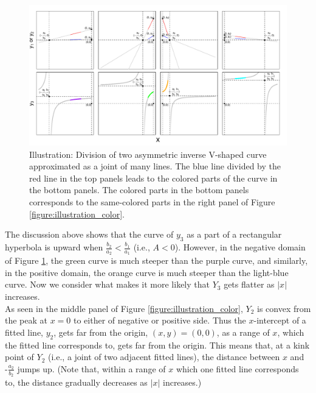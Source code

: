 \documentclass[11pt, a4paper]{article}
\begin{document}
\begin{figure}[H]
	\centering
	\hspace*{-2cm} 
	\includegraphics[width=1.4\columnwidth]{illustration_together.pdf}
	\caption{\small Illustration: Division of two asymmetric inverse V-shaped curve approximated as a joint of many lines. The blue line divided by the red line in the top panels leads to the colored parts of the curve in the bottom panels. The colored parts in the bottom panels corresponds to the same-colored parts in the right panel of Figure \ref{figure:illustration_color}.}
	\label{figure:illustration_hyperbola}
\end{figure}

\noindent
The discussion above shows that the curve of $y_3$ as a part of a rectangular hyperbola is upward when $\frac{b_2}{a_2} < \frac{b_1}{a_1}$ (i.e., $A<0$). However, in the negative domain of Figure \ref{figure:illustration_hyperbola}, the green curve is much steeper than the purple curve, and similarly, in the positive domain, the orange curve is much steeper than the light-blue curve. Now we consider what makes it more likely that $Y_3$ gets flatter as $|x|$ increases.\\

\noindent
As seen in the middle panel of Figure \ref{figure:illustration_color}, $Y_2$ is convex from the peak at $x=0$ to either of negative or positive side. 
Thus the $x$-intercept of a fitted line, $y_2$, gets far from the origin, $(x, y)=(0, 0)$, as a range of $x$, which the fitted line corresponds to, gets far from the origin. This means that, at a kink point of $Y_2$ (i.e., a joint of two adjacent fitted lines), the distance between $x$ and $\mbox{-}\frac{a_2}{b_2}$ jumps up. (Note that, within a range of $x$ which one fitted line corresponds to, the distance gradually decreases as $|x|$ increases.)\\
\end{document}
